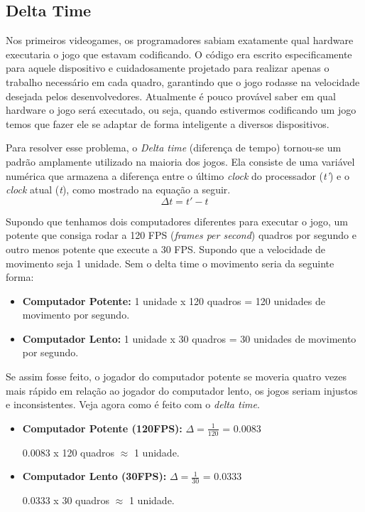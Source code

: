 \subsection{Delta Time}
\label{sec:delta-time}
Nos primeiros videogames, os programadores sabiam exatamente qual hardware executaria o jogo que estavam codificando. O código era escrito especificamente para aquele dispositivo e cuidadosamente projetado para realizar apenas o trabalho necessário em cada quadro, garantindo que o jogo rodasse na velocidade desejada pelos desenvolvedores.
Atualmente é pouco provável saber em qual hardware o jogo será executado, ou seja, quando estivermos codificando um jogo temos que fazer ele se adaptar de forma inteligente a diversos dispositivos.

 Para resolver esse problema, o \textit{Delta time} (diferença de tempo) tornou-se um padrão amplamente utilizado na maioria dos jogos. Ela consiste de uma variável numérica que armazena a diferença entre o último \textit{clock} do processador (\textit{t'}) e o \textit{clock} atual (\textit{t}), como mostrado na equação a seguir.
 \begin{equation}
    \Delta t = t' - t
    \label{eq:dt_equation}
\end{equation}

Supondo que tenhamos dois computadores diferentes para executar o jogo, um potente que consiga rodar a 120 FPS (\textit{frames per second}) quadros por segundo e outro menos potente que execute a 30 FPS. Supondo que a velocidade de movimento seja 1 unidade. Sem o delta time o movimento seria da seguinte forma:
\begin{itemize}
    \item \textbf{Computador Potente:} 1 unidade x 120 quadros = 120 unidades de movimento por segundo.
    \item \textbf{Computador Lento:} 1 unidade x 30 quadros = 30 unidades de movimento por segundo.
\end{itemize}

Se assim fosse feito, o jogador do computador potente se moveria quatro vezes mais rápido em relação ao jogador do computador lento, os jogos seriam injustos e inconsistentes. Veja agora como é feito com o \textit{delta time}.
\begin{itemize}
    \item \textbf{Computador Potente (120FPS):} \( \Delta = \frac{1}{120}\) = 0.0083 
    
    0.0083 x 120 quadros \begin{math} \approx\end{math} 1 unidade.
    \item \textbf{Computador Lento (30FPS):} \( \Delta = \frac{1}{30}\) = 0.0333 
    
    0.0333 x 30 quadros \begin{math} \approx\end{math} 1 unidade.
\end{itemize}

